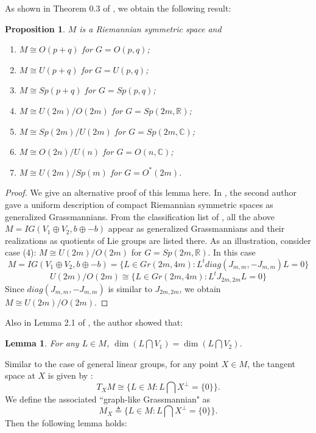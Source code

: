 \documentclass{article}
\newtheorem{lem}{Lemma}[section]
\newtheorem{prop}{Proposition}[section]
\begin{document}
As shown in Theorem 0.3 of \cite{He}, we obtain the following result:
\begin{prop} $M$ is a Riemannian symmetric space and
\begin{enumerate}
    \item $M \cong O(p+q)$ for $G = O(p, q)$;
    \item $M \cong U(p + q)$ for $G = U(p,q)$;
    \item $M \cong Sp(p + q)$ for $G = Sp(p,q)$;
    \item $M \cong U(2m)/O(2m)$ for $G = Sp(2m, \mathbb{R})$;
    \item $M \cong Sp(2m)/U(2m)$ for $G = Sp(2m, \mathbb{C})$;
    \item $M \cong O(2n)/U(n)$ for $G = O(n,\mathbb{C})$;
    \item $M \cong U(2m)/Sp(m)$ for $G = O^*(2m)$.
\end{enumerate}
\end{prop}
\begin{proof}
We give an alternative proof of this lemma here. In \cite{HL}, the second author gave a uniform description of compact Riemannian symmetric spaces as generalized Grassmannians. From the classification list of \cite{HL}, all
the above $M=IG(V_1 \oplus V_2, b\oplus-b)$ appear as generalized Grassmannians and their realizations as quotients of Lie groups are listed there. As an illustration, consider case
(4): $M \cong U(2m)/O(2m)$ for $G = Sp(2m, \mathbb{R})$. In this case
\[
M=IG(V_1 \oplus V_2, b\oplus-b)=\{L \in Gr(2m, 4m): L^t diag(J_{m,m},-J_{m,m})L=0\}
\]
\[
U(2m)/O(2m) \cong \{L \in Gr(2m, 4m): L^t J_{2m,2m}L=0\}
\]
Since $diag(J_{m,m},-J_{m,m})$ is similar to $J_{2m,2m}$, we obtain $M \cong U(2m)/O(2m)$.
\end{proof}


Also in Lemma 2.1 of \cite{He}, the author showed that:
\begin{lem}
For any $L \in M$, $\dim(L \bigcap V_1)=\dim(L \bigcap V_2)$.
\end{lem}

Similar to the case of general linear groups, for any point $X \in M$, the tangent space at $X$ is given by  \cite{C}:
\[
T_{X}M \cong \{L \in
M: L \bigcap X^\perp=\{0\}\}.
\]
We define the associated ``graph-like Grassmannian"  as
\[
M_{X} \triangleq \{L \in
M: L \bigcap X^{\perp}=\{0\}\}.
\]
Then the following lemma holds:
\end{document}
